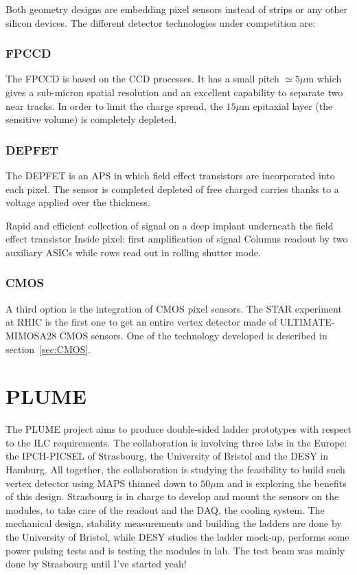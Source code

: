    Both geometry designs are embedding pixel sensors instead of strips or any other silicon devices.
   The different detector technologies under competition are:
    
   \subsubsection{FPCCD}
   
     The \gls{FPCCD} is based on the \gls{CCD} processes.
     It has a small pitch {$\simeq 5 \mu\text{m}$} which gives a sub-micron spatial resolution and an excellent capability to separate two near tracks.
     In order to limit the charge spread, the $15 \mu\text{m}$ epitaxial layer (the sensitive volume) is completely depleted.

   \subsubsection{DEPFET}
    
    The \gls{DEPFET} is an \gls{APS} in which field effect transistors are incorporated into each pixel.
    The sensor is completed depleted of free charged carries thanks to a voltage applied over the thickness.

    Rapid and efficient collection of signal on a deep implant underneath the field effect transistor
    Inside pixel: first amplification of signal
    Columns readout by two auxiliary \glspl{ASIC} while rows read out in rolling shutter mode.

   \subsubsection{CMOS}

   A third option is the integration of \gls{CMOS} pixel sensors. 
   The STAR experiment at RHIC is the first one to get an entire vertex detector made of ULTIMATE-MIMOSA28 CMOS sensors.
   One of the technology developed is described in section~\ref{sec:CMOS}.

  \section{PLUME}

  The \gls{PLUME} project aims to produce double-sided ladder prototypes with respect to the \gls{ILC} requirements.
  The collaboration is involving three labs in the Europe: the IPCH-PICSEL of Strasbourg, the University of Bristol and the DESY in Hamburg.
  All together, the collaboration is studying the feasibility to build such vertex detector using \gls{MAPS} thinned down to $50 \mu\text{m}$ and is exploring the benefits of this design.
  Strasbourg is in charge to develop and mount the sensors on the modules, to take care of the readout and the \gls{DAQ}, the cooling system.
  The mechanical design, stability measurements and building the ladders are done by the University of Bristol, while DESY studies the ladder mock-up, performs some power pulsing tests and is testing the modules in lab.
  The test beam was mainly done by Strasbourg until I've started yeah!

